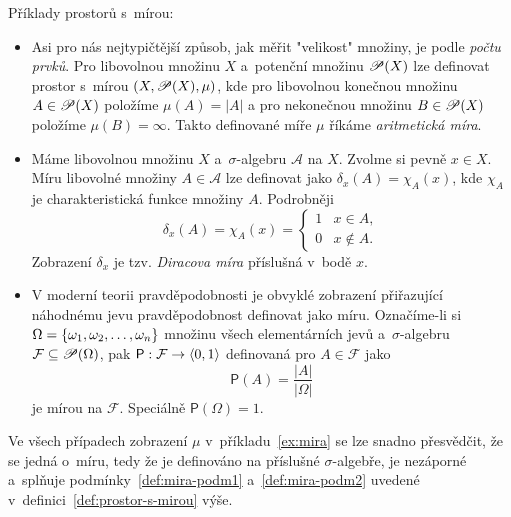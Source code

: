 \begin{example}\label{ex:mira}
    Příklady prostorů s~mírou:
    \begin{itemize}
        \item Asi pro nás nejtypičtější způsob, jak měřit "velikost" množiny, je podle \emph{počtu prvků}. Pro libovolnou množinu $X$ a~potenční množinu $\mathscr{P}(X)$ lze definovat prostor s~mírou $(X,\mathscr{P}(X),\mu)$, kde pro libovolnou konečnou množinu $A\in\mathscr{P}(X)$ položíme $\mu(A)=|A|$ a pro nekonečnou množinu $B\in\mathscr{P}(X)$ položíme $\mu(B)=\infty$. Takto definované míře $\mu$ říkáme \emph{aritmetická míra}.
        \item Máme libovolnou množinu $X$ a~$\sigma$-algebru $\mathcal{A}$ na $X$. Zvolme si pevně $x\in X$. Míru libovolné množiny $A\in\mathcal{A}$ lze definovat jako $\delta_x(A)=\chi_A(x)$, kde $\chi_A$ je charakteristická funkce množiny $A$. Podrobněji
        \[\delta_x(A)=\chi_A(x)=\begin{cases}
            1 & x\in A,\\
            0 & x\notin A.
        \end{cases}\]
        Zobrazení $\delta_x$ je tzv. \emph{Diracova míra} příslušná v~bodě $x$.
        \item V moderní teorii pravděpodobnosti je obvyklé zobrazení přiřazující náhodnému jevu pravděpodobnost definovat jako míru. Označíme-li si $\Omega=\left\{\omega_1,\omega_2,\ldots,\omega_n\right\}$ množinu všech elementárních jevů a~$\sigma$-algebru $\mathcal{F}\subseteq\mathscr{P}(\Omega)$, pak $\mathsf{P}:\mathcal{F} \rightarrow \langle0,1\rangle$ definovaná pro $A\in\mathcal{F}$ jako
        \[\mathsf{P}(A)=\dfrac{|A|}{|\Omega|}\]
        je mírou na $\mathcal{F}$. Speciálně $\mathsf{P}(\Omega)=1$.
    \end{itemize}
\end{example}

Ve všech případech zobrazení $\mu$ v~příkladu~\ref{ex:mira} se lze snadno přesvědčit, že se jedná o~míru, tedy že je definováno na příslušné $\sigma$-algebře, je nezáporné a~splňuje podmínky~\ref{def:mira-podm1} a~\ref{def:mira-podm2} uvedené v~definici~\ref{def:prostor-s-mirou} výše.

